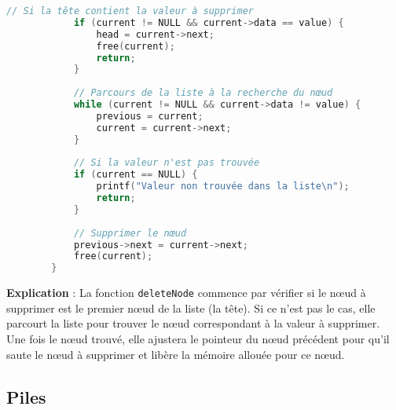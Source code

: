 \begin{enumerate}
\begin{lstlisting}[language=C]
			// Si la tête contient la valeur à supprimer
			if (current != NULL && current->data == value) {
				head = current->next;
				free(current);
				return;
			}
			
			// Parcours de la liste à la recherche du nœud
			while (current != NULL && current->data != value) {
				previous = current;
				current = current->next;
			}
			
			// Si la valeur n'est pas trouvée
			if (current == NULL) {
				printf("Valeur non trouvée dans la liste\n");
				return;
			}
			
			// Supprimer le nœud
			previous->next = current->next;
			free(current);
		}
	\end{lstlisting}
	
	\textbf{Explication} :
	La fonction \texttt{deleteNode} commence par vérifier si le nœud à supprimer est le premier nœud de la liste (la tête). Si ce n'est pas le cas, elle parcourt la liste pour trouver le nœud correspondant à la valeur à supprimer. Une fois le nœud trouvé, elle ajustera le pointeur du nœud précédent pour qu'il saute le nœud à supprimer et libère la mémoire allouée pour ce nœud.
	
\end{enumerate}




\subsection{Piles}

